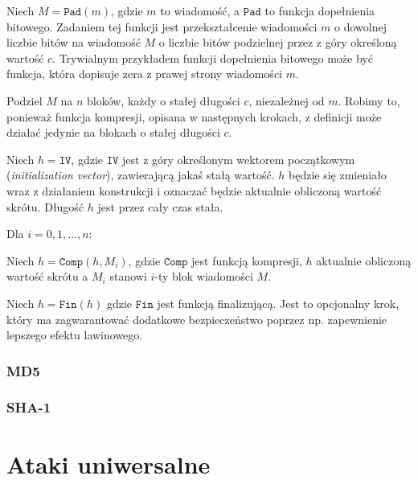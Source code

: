 \documentclass[12pt,a4paper,twoside]{article}
\begin{document}
\begin{myenumerate}
\item Niech $M = \mathtt{Pad}(m)$, gdzie $m$ to wiadomość, a $\mathtt{Pad}$ to
funkcja dopełnienia bitowego. Zadaniem tej funkcji jest przekształcenie
wiadomości $m$ o dowolnej liczbie bitów na wiadomość $M$ o liczbie bitów
podzielnej przez z góry określoną wartość $c$. Trywialnym przykładem funkcji
dopełnienia bitowego może być funkcja, która dopisuje zera z prawej strony
wiadomości $m$.

\item Podziel $M$ na $n$ bloków, każdy o stałej długości $c$, niezależnej od
$m$. Robimy to, ponieważ funkcja kompresji, opisana w następnych krokach, z
definicji może działać jedynie na blokach o stałej długości $c$.

\item Niech $h = \mathtt{IV}$, gdzie $\mathtt{IV}$ jest z góry określonym
wektorem początkowym (\textit{initialization vector}), zawierającą jakaś stałą
wartość. $h$ będzie się zmieniało wraz z działaniem konstrukcji i oznaczać
będzie aktualnie obliczoną wartość skrótu. Długość $h$ jest przez cały czas
stała.

\item Dla $i = 0, 1, \ldots, n$:

\begin{myenumerate}
\item Niech $h=\mathtt{Comp}(h,M_i)$, gdzie
$\mathtt{Comp}$ jest funkcją kompresji, $h$ aktualnie obliczoną wartość skrótu
a $M_i$ stanowi $i$-ty blok wiadomości $M$.
\end{myenumerate}

\item Niech $h=\mathtt{Fin}(h)$ gdzie $\mathtt{Fin}$ jest funkcją finalizującą.
Jest to opcjonalny krok, który ma zagwarantować dodatkowe bezpieczeństwo
poprzez np. zapewnienie lepszego efektu lawinowego.
\end{myenumerate}

\subsubsection{MD5}

\subsubsection{SHA-1}

\section{Ataki uniwersalne}
\label{sec:universal_attacks}
\end{document}
